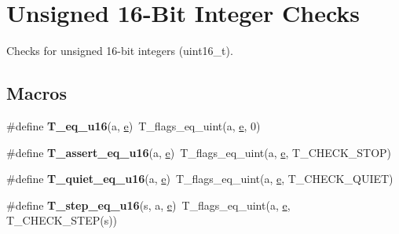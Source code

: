 \hypertarget{group__RTEMSTestFrameworkChecksUInt16}{}\section{Unsigned 16-\/Bit Integer Checks}
\label{group__RTEMSTestFrameworkChecksUInt16}


Checks for unsigned 16-\/bit integers (uint16\+\_\+t).  


\subsection*{Macros}
\begin{DoxyCompactItemize}
\item 
\mbox{\label{group__RTEMSTestFrameworkChecksUInt16_ga316157e86debeba6bd1986c1be75459c}} 
\#define {\bfseries T\+\_\+eq\+\_\+u16}(a,  \mbox{\hyperlink{sun4u_2tte_8h_a8b0b9ed08e0e18920ec2682f48228c27}{e}})~T\+\_\+flags\+\_\+eq\+\_\+uint(a, \mbox{\hyperlink{sun4u_2tte_8h_a8b0b9ed08e0e18920ec2682f48228c27}{e}}, 0)
\item 
\mbox{\label{group__RTEMSTestFrameworkChecksUInt16_ga44511f75ebd3fd742d217836c7db4bc0}} 
\#define {\bfseries T\+\_\+assert\+\_\+eq\+\_\+u16}(a,  \mbox{\hyperlink{sun4u_2tte_8h_a8b0b9ed08e0e18920ec2682f48228c27}{e}})~T\+\_\+flags\+\_\+eq\+\_\+uint(a, \mbox{\hyperlink{sun4u_2tte_8h_a8b0b9ed08e0e18920ec2682f48228c27}{e}}, T\+\_\+\+C\+H\+E\+C\+K\+\_\+\+S\+T\+OP)
\item 
\mbox{\label{group__RTEMSTestFrameworkChecksUInt16_ga3b08508be72cc44f0a1bbcd6809c0a3f}} 
\#define {\bfseries T\+\_\+quiet\+\_\+eq\+\_\+u16}(a,  \mbox{\hyperlink{sun4u_2tte_8h_a8b0b9ed08e0e18920ec2682f48228c27}{e}})~T\+\_\+flags\+\_\+eq\+\_\+uint(a, \mbox{\hyperlink{sun4u_2tte_8h_a8b0b9ed08e0e18920ec2682f48228c27}{e}}, T\+\_\+\+C\+H\+E\+C\+K\+\_\+\+Q\+U\+I\+ET)
\item 
\mbox{\label{group__RTEMSTestFrameworkChecksUInt16_gab6722dae34013294dfab4e40fc0423b8}} 
\#define {\bfseries T\+\_\+step\+\_\+eq\+\_\+u16}(s,  a,  \mbox{\hyperlink{sun4u_2tte_8h_a8b0b9ed08e0e18920ec2682f48228c27}{e}})~T\+\_\+flags\+\_\+eq\+\_\+uint(a, \mbox{\hyperlink{sun4u_2tte_8h_a8b0b9ed08e0e18920ec2682f48228c27}{e}}, T\+\_\+\+C\+H\+E\+C\+K\+\_\+\+S\+T\+EP(s))

\end{DoxyCompactItemize}
